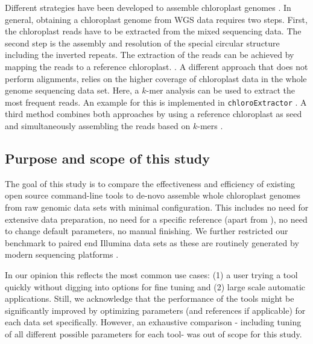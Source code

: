 \documentclass{bmcart}
\newcounter{todocounter}
\newcommand{\ak}[1]
{\stepcounter{todocounter}
 \todo[color=green!40,author=Arthur]{\thetodocounter: #1}
 }
\newcommand{\formatprogramnames}[1]{\texttt{#1}}
\newcommand{\ce}{\formatprogramnames{chloroExtractor}}
\begin{document}
Different strategies have been developed to assemble chloroplast genomes \cite{twyford_strategies_2017}.
In general, obtaining a chloroplast genome from WGS data requires two steps. First, the chloroplast reads have to be extracted from the mixed sequencing data. 
The second step is the assembly and resolution of the special circular structure including the inverted repeats.
The extraction of the reads can be achieved by mapping the reads to a reference chloroplast. \cite{Vinga2012}.
A different approach that does not perform alignments, relies on the higher coverage of chloroplast data in the whole genome sequencing data set\cite{Chan2013}.
Here, a $k$-mer analysis can be used to extract the most frequent reads.
An example for this is implemented in \ce{} \cite{j_ankenbrand_chloroextractor:_2018}. %
A third method combines both approaches by using a reference chloroplast as seed and simultaneously assembling the reads based on $k$-mers \cite{dierckxsens_novoplasty:_2017}.


\subsection*{Purpose and scope of this study}
The goal of this study is to compare the effectiveness and efficiency of existing open source command-line tools to de-novo assemble whole chloroplast genomes from raw genomic data sets with minimal configuration. 
This includes no need for extensive data preparation, no need for a specific reference (apart from ), no need to change default parameters, no manual finishing.
We further restricted our benchmark to paired end Illumina data sets as these are routinely generated by modern sequencing platforms \cite{Goodwin2016}. 

In our opinion this reflects the most common use cases: (1) a user trying a tool quickly without digging into options for fine tuning and (2) large scale automatic applications.
Still, we acknowledge that the performance of the tools might be significantly improved by optimizing parameters (and references if applicable) for each data set specifically.
However, an exhaustive comparison - including tuning of all different possible parameters for each tool- was out of scope for this study. 
\end{document}
